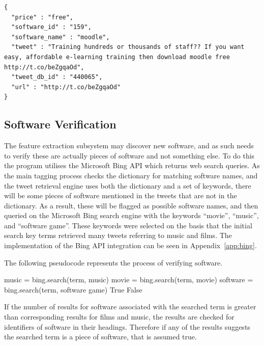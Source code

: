\begin{lstlisting}[caption=Another example of some extracted features, label=lst:extr2]
{
  "price" : "free",
  "software_id" : "159",
  "software_name" : "moodle",
  "tweet" : "Training hundreds or thousands of staff?? If you want easy, affordable e-learning training then download moodle free http://t.co/beZgqaOd",
  "tweet_db_id" : "440065",
  "url" : "http://t.co/beZgqaOd"
}
\end{lstlisting}

\subsection{Software Verification}
\label{sec:bing}
The feature extraction subsystem may discover new software, and as such needs to verify these are actually pieces of software and not something else. To do this the program utilises the Microsoft Bing API which returns web search queries. As the main tagging process checks the dictionary for matching software names, and the tweet retrieval engine uses both the dictionary and a set of keywords, there will be some pieces of software mentioned in the tweets that are not in the dictionary. As a result, these will be flagged as possible software names, and then queried on the Microsoft Bing search engine with the keywords ``movie'', ``music'', and ``software game''. These keywords were selected on the basis that the initial search key terms retrieved many tweets referring to music and films. The implementation of the Bing API integration can be seen in Appendix~\ref{app:bing}.

The following pseudocode represents the process of verifying software.
\newline
\begin{algorithmic}
    \State music = bing.search(term, music)
    \State movie = bing.search(term, movie)
    \State software = bing.search(term, software game)
    \newline
            \State \Return True
        \EndIf
    \EndIf
    \newline
    \State \Return False
\EndFunction
\newline
\end{algorithmic}
If the number of results for software associated with the searched term is greater than corresponding results for films and music, the results are checked for identifiers of software in their headings. Therefore if any of the results suggests the searched term is a piece of software, that is assumed true.

